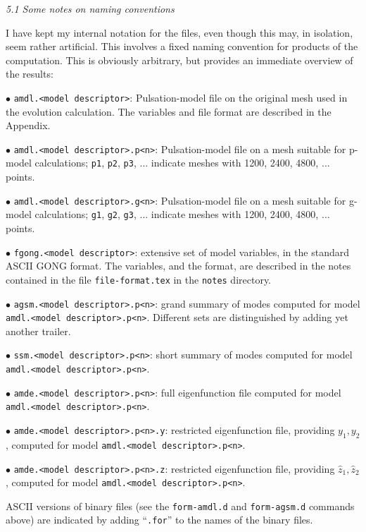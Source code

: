 \subsect
{\it 5.1 Some notes on naming conventions}

I have kept my internal notation for the files,
even though this may, in isolation, seem rather artificial.
This involves a fixed naming convention
for products of the computation.
This is obviously arbitrary, but provides an immediate
overview of the results:

\item{$\bullet$}
{\tt amdl.<model descriptor>}: Pulsation-model file on the original mesh
used in the evolution calculation.
The variables and file format are described in the Appendix.
\item{$\bullet$}
{\tt amdl.<model descriptor>.p<n>}: 
Pulsation-model file on a mesh suitable for p-model calculations;
{\tt p1}, {\tt p2}, {\tt p3}, $\ldots$ indicate meshes with 1200, 2400,
4800, $\ldots$ points.
\item{$\bullet$}
{\tt amdl.<model descriptor>.g<n>}: 
Pulsation-model file on a mesh suitable for g-model calculations;
{\tt g1}, {\tt g2}, {\tt g3}, $\ldots$ indicate meshes with 1200, 2400,
4800, $\ldots$ points.
\item{$\bullet$}
{\tt fgong.<model descriptor>}: extensive set of model variables,
in the standard ASCII GONG format.
The variables, and the format, are described in the notes
contained in the file \nwl
{\tt file-format.tex} in the {\tt notes} directory.

\medskip

\item{$\bullet$}
{\tt agsm.<model descriptor>.p<n>}: grand summary of modes computed
for model \nwl
{\tt amdl.<model descriptor>.p<n>}.
Different sets are distinguished by adding yet another trailer.
\item{$\bullet$}
{\tt ssm.<model descriptor>.p<n>}: short summary of modes computed
for model \nwl
{\tt amdl.<model descriptor>.p<n>}.
\item{$\bullet$}
{\tt amde.<model descriptor>.p<n>}: full eigenfunction file computed
for model \nwl
{\tt amdl.<model descriptor>.p<n>}.
\item{$\bullet$}
{\tt amde.<model descriptor>.p<n>.y}: restricted eigenfunction file,
providing $y_1, y_2$, computed
for model {\tt amdl.<model descriptor>.p<n>}.
\item{$\bullet$}
{\tt amde.<model descriptor>.p<n>.z}: restricted eigenfunction file,
providing $\hat z_1, \hat z_2$, computed
for model {\tt amdl.<model descriptor>.p<n>}.

\medskip
ASCII versions of binary files (see the {\tt form-amdl.d} and
{\tt form-agsm.d} commands above) are indicated by adding ``{\tt .for}''
to the names of the binary files.


